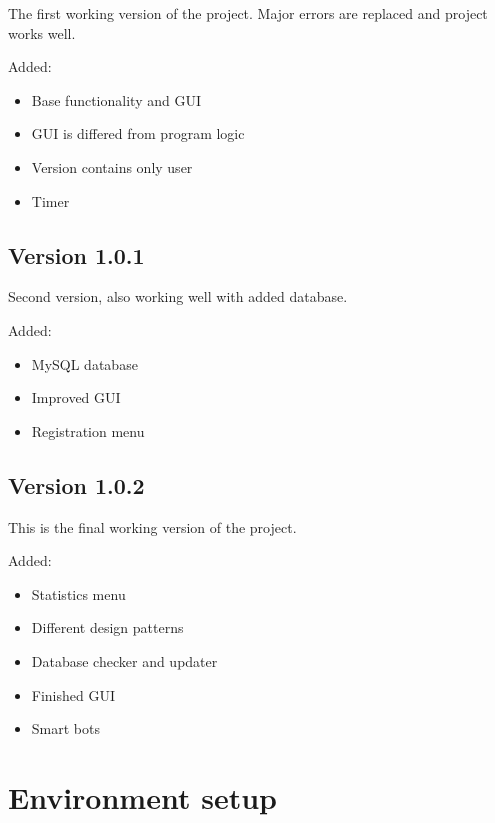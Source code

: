 \documentclass[
]{report}
\providecommand{\tightlist}{%
  \setlength{\itemsep}{0pt}\setlength{\parskip}{0pt}}
\begin{document}
The first working version of the project. Major errors are replaced and project works well.

Added:

\begin{itemize}
\tightlist
\item
  Base functionality and GUI
\item
  GUI is differed from program logic
\item
  Version contains only user
\item
  Timer
\end{itemize}

\hypertarget{version-1.0.1}{%
\section{Version 1.0.1}\label{version-1.0.1}}

Second version, also working well with added database.

Added:

\begin{itemize}
\tightlist
\item
  MySQL database
\item
  Improved GUI
\item
  Registration menu
\end{itemize}

\hypertarget{version-1.0.2}{%
\section{Version 1.0.2}\label{version-1.0.2}}

This is the final working version of the project.

Added:

\begin{itemize}
\tightlist
\item
  Statistics menu
\item
  Different design patterns
\item
  Database checker and updater
\item
  Finished GUI
\item
  Smart bots
\end{itemize}

\hypertarget{environment-setup}{%
\chapter{Environment setup}\label{environment-setup}}
\end{document}
